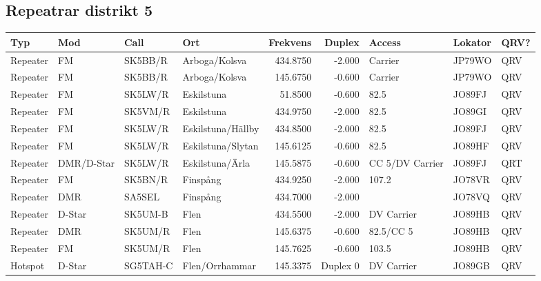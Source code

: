 \subsection{Repeatrar distrikt 5}
\scriptsize
\begin{longtable}{llllrrlll}
\bf Typ  & \bf Mod    & \bf Call & \bf Ort           & \bf Frekvens & \bf Duplex & \bf Access      & \bf Lokator & \bf QRV? \\ \hline
Repeater & FM         & SK5BB/R  & Arboga/Kolsva     & 434.8750     & -2.000     & Carrier         & JP79WO      & QRV      \\
Repeater & FM         & SK5BB/R  & Arboga/Kolsva     & 145.6750     & -0.600     & Carrier         & JP79WO      & QRV      \\
Repeater & FM         & SK5LW/R  & Eskilstuna        & 51.8500      & -0.600     & 82.5            & JO89FJ      & QRV      \\
Repeater & FM         & SK5VM/R  & Eskilstuna        & 434.9750     & -2.000     & 82.5            & JO89GI      & QRV      \\
Repeater & FM         & SK5LW/R  & Eskilstuna/Hällby & 434.8500     & -2.000     & 82.5            & JO89FJ      & QRV      \\
Repeater & FM         & SK5LW/R  & Eskilstuna/Slytan & 145.6125     & -0.600     & 82.5            & JO89HF      & QRV      \\
Repeater & DMR/D-Star & SK5LW/R  & Eskilstuna/Ärla   & 145.5875     & -0.600     & CC 5/DV Carrier & JO89FJ      & QRT      \\
Repeater & FM         & SK5BN/R  & Finspång          & 434.9250     & -2.000     & 107.2           & JO78VR      & QRV      \\
Repeater & DMR        & SA5SEL   & Finspång          & 434.7000     & -2.000     &                 & JO78VQ      & QRV      \\
Repeater & D-Star     & SK5UM-B  & Flen              & 434.5500     & -2.000     & DV Carrier      & JO89HB      & QRV      \\
Repeater & DMR        & SK5UM/R  & Flen              & 145.6375     & -0.600     & 82.5/CC 5       & JO89HB      & QRV      \\
Repeater & FM         & SK5UM/R  & Flen              & 145.7625     & -0.600     & 103.5           & JO89HB      & QRV      \\
Hotspot  & D-Star     & SG5TAH-C & Flen/Orrhammar    & 145.3375     & Duplex 0   & DV Carrier      & JO89GB      & QRV      \\

\end{longtable}
